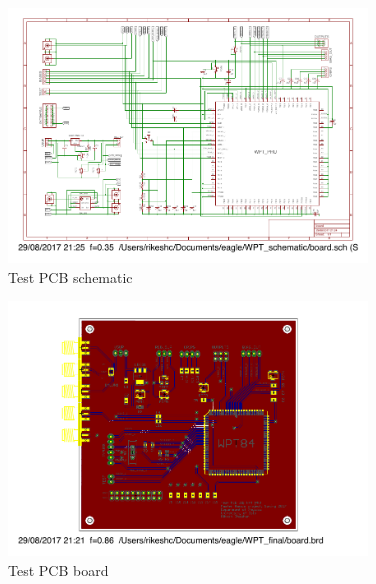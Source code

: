 \documentclass[UKenglish]{ifimaster}  %
\begin{document}
\begin{appendices}
\begin{figure} [!htbp]	%
 	\centering
  	\includegraphics[width=0.85\textwidth]{appendix/pcb_schematic.pdf} 
 	\caption{Test PCB schematic} 
	\label{fig:appen_schemtic_pcb} 
\end{figure}

\begin{figure} [!htbp]	%
 	\centering
  	\includegraphics[width=0.85\textwidth]{appendix/pcb_board.pdf} 
 	\caption{Test PCB board} 
	\label{fig:appen_board_pcb} 
\end{figure}

\end{appendices} %

\backmatter{}	%

\cleardoublepage
{}
{}
\nocite{*}
\printbibliography

\cleardoublepage
{}
{}
\printnoidxglossaries
\end{document}
